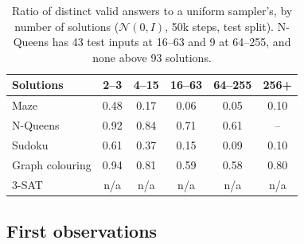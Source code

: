 \documentclass[11pt]{article}
\begin{document}
\begin{table}[h]
\centering\small
\begin{tabular}{@{}lccccc@{}}
\toprule
Solutions & 2--3 & 4--15 & 16--63 & 64--255 & 256+ \\
\midrule
Maze & 0.48 & 0.17 & 0.06 & 0.05 & 0.10 \\
N-Queens & 0.92 & 0.84 & 0.71 & 0.61 & -- \\
Sudoku & 0.61 & 0.37 & 0.15 & 0.09 & 0.10 \\
Graph colouring & 0.94 & 0.81 & 0.59 & 0.58 & 0.80 \\
3-SAT & n/a & n/a & n/a & n/a & n/a \\
\bottomrule
\end{tabular}
\caption{Ratio of distinct valid answers to a uniform sampler's, by number of solutions ($\mathcal{N}(0,I)$, 50k
steps, test split). N-Queens has 43 test inputs at 16--63 and 9 at 64--255, and none above 93 solutions.}
\label{tab:ratio}
\end{table}

\subsection{First observations}
\label{sec:obs}
\end{document}
